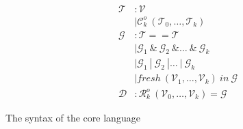 \begin{align*} 
\mathcal{T} &:    \mathcal{V} \\ 
            &\mid \mathcal{C}^o_k \ (\mathcal{T}_0, \dots, \mathcal{T}_k) \\  
\mathcal{G} &:    \mathcal{T} == \mathcal{T}  \\ 
            &\mid \mathcal{G}_1 \ \& \ \mathcal{G}_2 \ \& \dots \ \& \ \mathcal{G}_k  \\ 
            &\mid \mathcal{G}_1 \ | \ \mathcal{G}_2 \ | \dots \ | \ \mathcal{G}_k  \\ 
            &\mid fresh \ (\mathcal{V}_1, \dots, \mathcal{V}_k) \ in \  \mathcal{G} \\ 
\mathcal{D} &:    \mathcal{R}^o_k \ (\mathcal{V}_0, \dots, \mathcal{V}_k) = \mathcal{G}
\end{align*}

\caption{The syntax of the core \mk language}
\label{fig:background:mksyntax}
